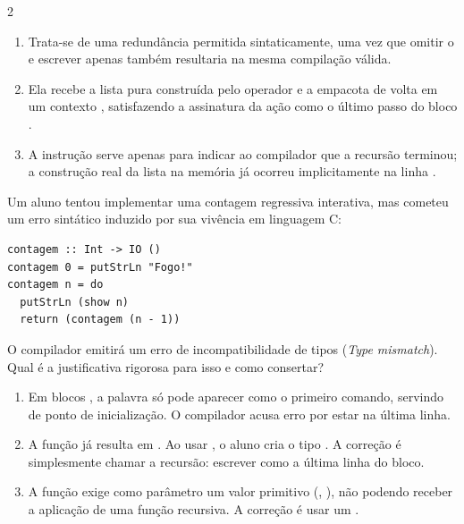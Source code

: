 \documentclass[a4paper,10pt,brazil]{article}
\begin{document}
\begin{multicols}{2}
\begin{enumerate}
  \item Trata-se de uma redundância permitida sintaticamente, uma vez que omitir o  e escrever apenas  também resultaria na mesma compilação válida.

  \item Ela recebe a lista pura construída pelo operador \haskellinline{(:)} e a empacota de volta em um contexto , satisfazendo a assinatura da ação como o último passo do bloco .

  \item A instrução  serve apenas para indicar ao compilador que a recursão terminou; a construção real da lista na memória já ocorreu implicitamente na linha .


\end{enumerate}

Um aluno tentou implementar uma contagem regressiva interativa, mas cometeu um erro sintático induzido por sua vivência em linguagem C:

\begin{verbatim}
contagem :: Int -> IO ()
contagem 0 = putStrLn "Fogo!"
contagem n = do
  putStrLn (show n)
  return (contagem (n - 1))
\end{verbatim}

O compilador emitirá um erro de incompatibilidade de tipos (\emph{Type mismatch}). Qual é a justificativa rigorosa para isso e como consertar?

\begin{enumerate}
  \item Em blocos , a palavra  só pode aparecer como o primeiro comando, servindo de ponto de inicialização. O compilador acusa erro por estar na última linha.

  \item A função  já resulta em . Ao usar , o aluno cria o tipo . A correção é simplesmente chamar a recursão: escrever  como a última linha do bloco.

  \item A função  exige como parâmetro um valor primitivo (, ), não podendo receber a aplicação de uma função recursiva. A correção é usar um .


\end{enumerate}
\end{multicols}
\end{document}
